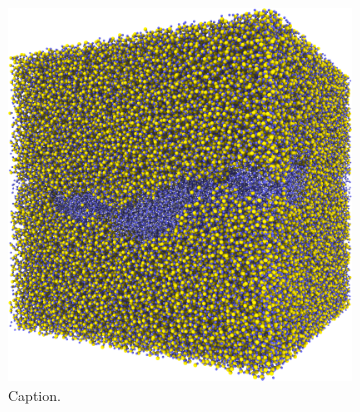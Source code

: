 \begin{figure}[htpb]%
    \centering%
    \setlength{\myfigwidth}{0.49\textwidth}%
%
    \begin{subfigure}[b]{\myfigwidth}%
        \centering%
        \includegraphics[width=\textwidth]{images/systems/trimmed-rough_fracture01_abel_13}%
        \caption{Caption.}%
    \end{subfigure}%
    \hfill%
        \begin{subfigure}[b]{\myfigwidth}%
        \centering%

\end{subfigure}
\end{figure}
